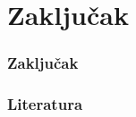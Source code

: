\documentclass{beamer}
\begin{document}
\section{Zaključak}
\begin{frame}
\frametitle{Zaključak}
\end{frame}

\begin{frame}
\frametitle{Literatura}


\end{frame}
\end{document}
